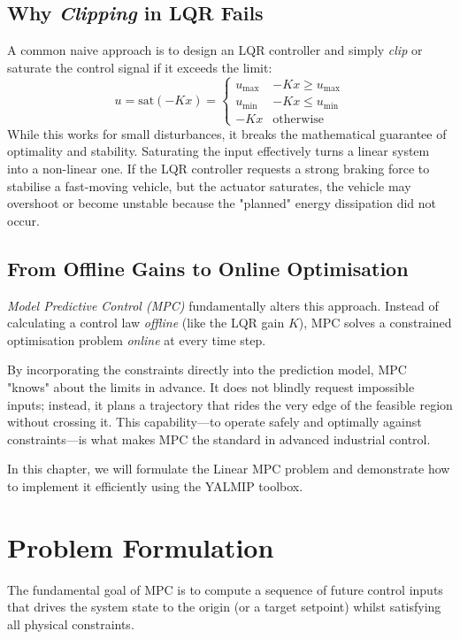 \subsection*{Why \emph{Clipping} in LQR Fails}
A common naive approach is to design an LQR controller and simply \emph{clip} or saturate the control signal if it exceeds the limit: 
\[ u = \text{sat}(-Kx) = \begin{cases}
	u_\text{max} & -Kx \ge u_\text{max} \\
	u_\text{min} & -Kx \le u_\text{min} \\
	-Kx & \text{otherwise}
\end{cases} \]
While this works for small disturbances, it breaks the mathematical guarantee of optimality and stability. Saturating the input effectively turns a linear system into a non-linear one. If the LQR controller requests a strong braking force to stabilise a fast-moving vehicle, but the actuator saturates, the vehicle may overshoot or become unstable because the "planned" energy dissipation did not occur.

\subsection*{From Offline Gains to Online Optimisation}
\emph{Model Predictive Control (MPC)} fundamentally alters this approach. Instead of calculating a control law \textit{offline} (like the LQR gain $K$), MPC solves a constrained optimisation problem \textit{online} at every time step.

By incorporating the constraints directly into the prediction model, MPC "knows" about the limits in advance. It does not blindly request impossible inputs; instead, it plans a trajectory that rides the very edge of the feasible region without crossing it. This capability—to operate safely and optimally against constraints—is what makes MPC the standard in advanced industrial control.

In this chapter, we will formulate the Linear MPC problem and demonstrate how to implement it efficiently using the YALMIP toolbox.

\section{Problem Formulation}
\label{sec:mpc_formulation}

The fundamental goal of MPC is to compute a sequence of future control inputs that drives the system state to the origin (or a target setpoint) whilst satisfying all physical constraints.

